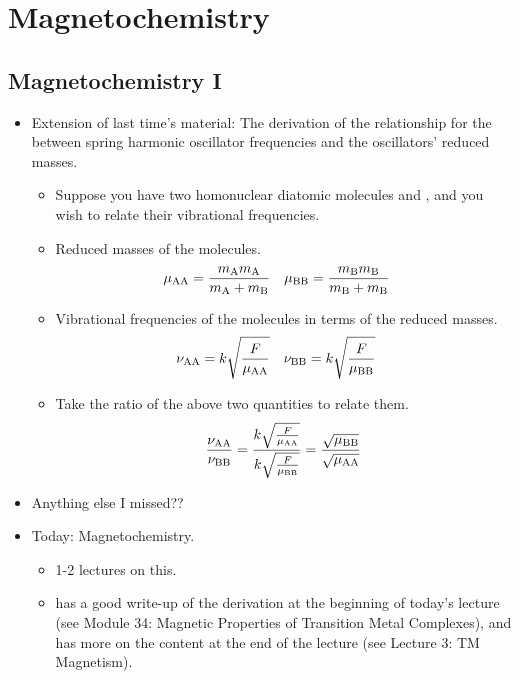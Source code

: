 \documentclass[../notes.tex]{subfiles}
\begin{document}
\chapter{Magnetochemistry}
\section{Magnetochemistry I}
\begin{itemize}
    \item {}Extension of last time's material: The derivation of the relationship for the between spring harmonic oscillator frequencies and the oscillators' reduced masses.
    \begin{itemize}
        \item Suppose you have two homonuclear diatomic molecules  and , and you wish to relate their vibrational frequencies.
        \item Reduced masses of the molecules.
        \begin{align*}
            \mu_{\ce{AA}} &= \frac{m_{\ce{A}}m_{\ce{A}}}{m_{\ce{A}}+m_{\ce{B}}}&
            \mu_{\ce{BB}} &= \frac{m_{\ce{B}}m_{\ce{B}}}{m_{\ce{B}}+m_{\ce{B}}}
        \end{align*}
        \item Vibrational frequencies of the molecules in terms of the reduced masses.
        \begin{align*}
            \nu_{\ce{AA}} &= k\sqrt{\frac{F}{\mu_{\ce{AA}}}}&
            \nu_{\ce{BB}} &= k\sqrt{\frac{F}{\mu_{\ce{BB}}}}
        \end{align*}
        \item Take the ratio of the above two quantities to relate them.
        \begin{equation*}
            \frac{\nu_{\ce{AA}}}{\nu_{\ce{BB}}} = \frac{k\sqrt{\frac{F}{\mu_{\ce{AA}}}}}{k\sqrt{\frac{F}{\mu_{\ce{BB}}}}}
            = \frac{\sqrt{\mu_{\ce{BB}}}}{\sqrt{\mu_{\ce{AA}}}}
        \end{equation*}
    \end{itemize}
    \item Anything else I missed??
    \item Today: Magnetochemistry.
    \begin{itemize}
        \item 1-2 lectures on this.
        \item \textcite{bib:CHEM20100Notes} has a good write-up of the derivation at the beginning of today's lecture (see Module 34: Magnetic Properties of Transition Metal Complexes), and \textcite{bib:CHEM20200Notes} has more on the content at the end of the lecture (see Lecture 3: TM Magnetism).

\end{itemize}
\end{itemize}
\end{document}
